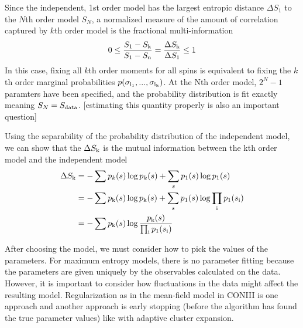 \documentclass[aps,prl,twocolumn]{revtex4-1}
\begin{document}
Since the independent, 1st order model has the largest entropic distance $\Delta S_1$ to the $N$th order model $S_N$, a normalized measure of the amount of correlation captured by $k$th order model is the fractional multi-information
\begin{align}
	0\leq \frac{S_1 - S_{\rm k}}{S_{\rm 1}-S_{\rm n}} = \frac{\Delta S_{\rm k}}{\Delta S_{\rm 1}} \leq 1
\end{align}
In this case, fixing all $k$th order moments for all spins is equivalent to fixing the $k$th order marginal probabilities $p(\sigma_{\rm i_1},...,\sigma_{\rm i_k})$. At the Nth order model, $2^N-1$ paramters have been specified, and the probability distribution is fit exactly meaning $S_N = S_{\rm data}$. [estimating this quantity properly is also an important question]

Using the separability of the probability distribution of the independent model, we can show that the $\Delta S_{\rm k}$ is the mutual information between the kth order model and the independent model
\begin{align}
	\Delta S_{\rm k} &= -\sum p_k(s)\log p_k(s) + \sum_s p_1(s) \log p_1(s) \\
		&= -\sum p_{\rm k}(s)\log p_{\rm k}(s) + \sum_s p_1(s) \log \prod_{\rm i} p_1(s_{\rm i})\\
		&= -\sum p_{\rm k}(s)\log \frac{p_{\rm k}(s)}{\prod_{\rm i} p_1(s_{\rm i})}
\end{align}

After choosing the model, we must consider how to pick the values of the parameters. For maximum entropy models, there is no parameter fitting because the parameters are given uniquely by the observables calculated on the data. However, it is important to consider how fluctuations in the data might affect the resulting model. Regularization as in the mean-field model in CONIII is one approach and another approach is early stopping (before the algorithm has found the true parameter values) like with adaptive cluster expansion.

%
%
\end{document}
